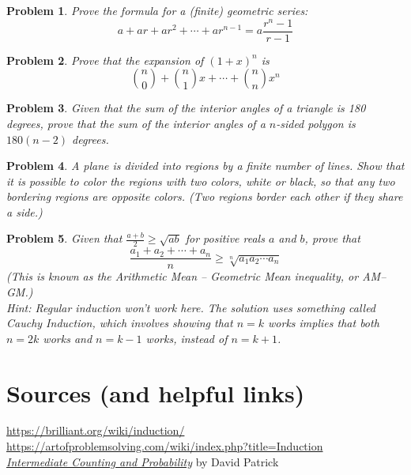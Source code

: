 \documentclass[a4paper]{scrartcl}
\newtheorem{u_problem}{Problem}
\begin{document}
\begin{u_problem}
	Prove the formula for a (finite) geometric series:
	\[a + ar + ar^2 + \cdots + ar^{n-1} = a\frac{r^n - 1}{r-1}\]
\end{u_problem}

\begin{u_problem}
	Prove that the expansion of ${\left(1 + x\right)}^n$ is
	\[\binom{n}{0} + \binom{n}{1}x + \cdots + \binom{n}{n}x^n\]
\end{u_problem}

\begin{u_problem}
	Given that the sum of the interior angles of a triangle is 180 degrees, prove that the sum of the interior angles of a $n$-sided polygon is $180(n-2)$ degrees.
\end{u_problem}

\begin{u_problem}
	A plane is divided into regions by a finite number of lines. Show that it is possible to color the regions with two colors, white or black, so that any two bordering regions are opposite colors. (Two regions border each other if they share a side.)
\end{u_problem}

\begin{u_problem}
	Given that $\frac{a+b}{2} \geq \sqrt{ab}$ for positive reals $a$ and $b$, prove that \[\frac{a_1 + a_2 + \cdots + a_n}{n} \geq \sqrt[n]{a_1 a_2 \cdots a_n}\] (This is known as the Arithmetic Mean -- Geometric Mean inequality, or AM--GM.)  \\
	Hint: Regular induction won't work here. The solution uses something called Cauchy Induction, which involves showing that $n=k$ works implies that both $n=2k$ works and $n=k-1$ works, instead of $n=k+1$.
\end{u_problem}
\section{Sources (and helpful links)}
\url{https://brilliant.org/wiki/induction/} \\
\url{https://artofproblemsolving.com/wiki/index.php?title=Induction} \\
\href{https://artofproblemsolving.com/store/book/intermediate-counting}{\emph{Intermediate Counting and Probability}} by David Patrick
\end{document}
